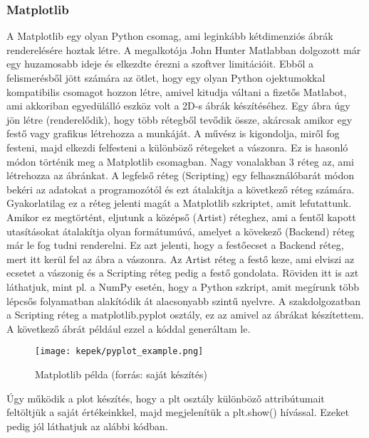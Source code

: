 \documentclass{article}
\theoremstyle{definition}
\theoremstyle{theorem}
\begin{document}
\subsubsection{Matplotlib}
A Matplotlib egy olyan Python csomag, ami leginkább kétdimenziós ábrák renderelésére hoztak létre. A megalkotója John Hunter Matlabban dolgozott már egy huzamosabb ideje és elkezdte érezni a szoftver limitációit. Ebből a felismerésből jött számára az ötlet, hogy egy olyan Python ojektumokkal kompatibilis csomagot hozzon létre, amivel kitudja váltani a fizetős Matlabot, ami akkoriban egyedülálló eszköz volt a 2D-s ábrák készítéséhez. Egy ábra úgy jön létre (renderelődik), hogy több rétegből tevődik össze, akárcsak amikor egy festő vagy grafikus létrehozza a munkáját. A művész is kigondolja, miről fog festeni, majd elkezdi felfesteni a különböző rétegeket a vászonra. Ez is hasonló módon történik meg a Matplotlib csomagban. Nagy vonalakban 3 réteg az, ami létrehozza az ábránkat. A legfelső réteg (Scripting) egy felhasználóbarát módon bekéri az adatokat a programozótól és ezt átalakítja a következő réteg számára. Gyakorlatilag ez a réteg jelenti magát a Matplotlib szkriptet, amit lefutattunk. Amikor ez megtörtént, eljutunk a középső (Artist) réteghez, ami a fentől kapott utasításokat átalakítja olyan formátumúvá, amelyet a kövekező (Backend) réteg már le fog tudni renderelni. Ez azt jelenti, hogy a festőecset a Backend réteg, mert itt kerül fel az ábra a vászonra. Az Artist réteg a festő keze, ami elviszi az ecsetet a vászonig és a Scripting réteg pedig a festő gondolata. Röviden itt is azt láthatjuk, mint pl. a NumPy esetén, hogy a Python szkript, amit megírunk több lépcsős folyamatban alakítódik át alacsonyabb szintű nyelvre.\newline
A szakdolgozatban a Scripting réteg a matplotlib.pyplot osztály, ez az amivel az ábrákat készítettem.
A következő ábrát például ezzel a kóddal generáltam le.
\begin{figure} [!h]
    \centering
    \texttt{[image: kepek/pyplot\_example.png]}
    \caption{Matplotlib példa (forrás: saját készítés)}
    \label{Matplotlib_pelda}
\end{figure}

Úgy működik a plot készítés, hogy a plt osztály különböző attribútumait feltöltjük a saját értékeinkkel, majd megjelenítük a plt.show() hívással. Ezeket pedig jól láthatjuk az alábbi kódban.


\end{document}
